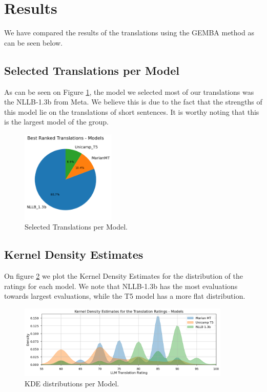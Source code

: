 \documentclass{article}
\begin{document}
\section{Results}

We have compared the results of the translations using the GEMBA method as can be seen below.

\subsection{Selected Translations per Model}

As can be seen on Figure \ref{fig:pie}, the model we selected most of our
translations was the NLLB-1.3b from Meta. We believe this is due to the fact
that the strengths of this model lie on the translations of short sentences. It
is worthy noting that this is the largest model of the group.

\begin{figure}[htbp]
    \centering
    \includegraphics[width=0.4\textwidth]{figures/pie-chart.png}
    \caption{\label{fig:pie}Selected Translations per Model.}
\end{figure}
\FloatBarrier

\subsection{Kernel Density Estimates}

On figure \ref{fig:kde} we plot the Kernel Density Estimates for the
distribution of the ratings for each model. We note that NLLB-1.3b has the most
evaluations towards largest evaluations, while the T5 model has a more flat
distribution.

\begin{figure}[htbp]
    \centering
    \includegraphics[width=0.9\textwidth]{figures/kde.png}
    \caption{\label{fig:kde}KDE distributions per Model.}
\end{figure}
\FloatBarrier
\end{document}
